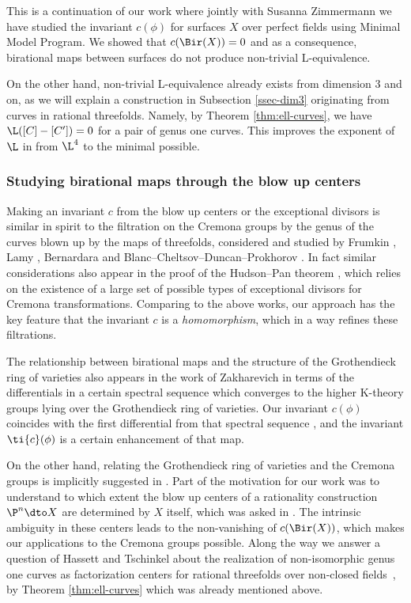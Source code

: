 This is a continuation of our work \cite{LSZ20} where
jointly with Susanna Zimmermann we have studied
the invariant $c(\phi)$ for surfaces $X$ over perfect fields
using Minimal Model Program.
We showed that
$c(\Bir(X)) = 0$
and as a consequence, birational maps between surfaces
do not produce non-trivial L-equivalence.

On the other hand,
non-trivial L-equivalence
already exists from dimension $3$ and on,
as we will
explain a construction in Subsection \ref{ssec-dim3} originating from curves in rational threefolds.
Namely, by Theorem \ref{thm:ell-curves}, we have $\L([C] - [C']) = 0$ for a pair of genus one curves.
This improves the exponent of $\L$ in
\cite{ShinderZhang} from $\L^4$ to the minimal possible.





\subsubsection{Studying birational maps through the blow up centers}


Making an invariant $c$ from the blow up centers
or the exceptional divisors is similar in spirit
to the filtration on the Cremona groups by the
genus of the curves blown up by
the maps
of threefolds,
considered and studied
by Frumkin \cite{Frumkin-Cremona},
Lamy
\cite{Lamy-Cremona}, Bernardara \cite{Bernardara-Cremona}
and Blanc--Cheltsov--Duncan--Prokhorov \cite{BCDP}.
In fact similar considerations also appear in
the proof of the Hudson--Pan theorem
\cite{HudsonPan}, which relies on
the existence of a large
set of possible types of exceptional divisors
for Cremona transformations.
Comparing to the above works,
our approach has the key feature
that the invariant $c$ is a \emph{homomorphism}, which in a way
refines these filtrations.

The relationship between birational maps and the structure
of the Grothendieck ring of varieties also
appears in the work
of Zakharevich in terms of the differentials
in a certain spectral sequence \cite{Zakharevich}
which converges to the higher K-theory groups
lying over
the Grothendieck ring of varieties.
Our invariant $c(\phi)$ coincides with the first
differential from that spectral sequence \cite[Lemma 3.2]{Zakharevich},
and the invariant $\ti{c}(\phi)$ is a certain
enhancement of that map.


On the other hand, relating the Grothendieck
ring of varieties and the Cremona groups is
implicitly suggested in \cite{HassettLai}.
Part of the motivation for our work was to understand
to which extent the blow up centers of a rationality construction $\P^n \dto X$ are determined
by $X$ itself, which was asked in \cite[Introduction]{HassettLai}.
The intrinsic ambiguity in these centers
leads to the non-vanishing of $c(\Bir(X))$,
which makes our applications to the Cremona groups possible.
Along the way we answer a question
of Hassett and Tschinkel about the
realization of non-isomorphic genus one curves as
 factorization centers
for rational threefolds over non-closed fields~\cite[Remark 23 (2)]{HassettTschinkelCycle}, by Theorem \ref{thm:ell-curves} which
was already mentioned above.



